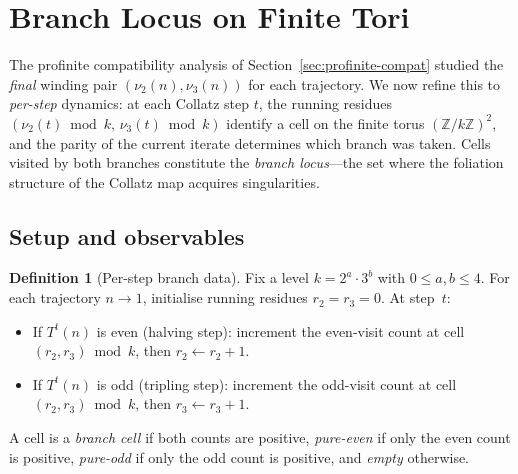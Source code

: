 \documentclass[11pt,a4paper]{article}
\newcommand{\Z}{\mathbb{Z}}
\theoremstyle{plain}
\theoremstyle{definition}
\newtheorem{definition}[theorem]{Definition}
\begin{document}
\section{Branch Locus on Finite Tori}\label{sec:branch-locus}

The profinite compatibility analysis of Section~\ref{sec:profinite-compat}
studied the \emph{final} winding pair $(\nu_2(n), \nu_3(n))$ for each
trajectory.  We now refine this to \emph{per-step} dynamics: at each
Collatz step $t$, the running residues
$(\nu_2(t) \bmod k,\, \nu_3(t) \bmod k)$ identify a cell on the finite
torus $(\Z/k\Z)^2$, and the parity of the current iterate determines
which branch was taken.  Cells visited by both branches constitute the
\emph{branch locus}---the set where the foliation structure of the
Collatz map acquires singularities.


\subsection{Setup and observables}

\begin{definition}[Per-step branch data]\label{def:branch-data}
    Fix a level $k = 2^a \cdot 3^b$ with $0 \leq a,b \leq 4$.  For each
    trajectory $n \to 1$, initialise running residues $r_2 = r_3 = 0$.
    At step~$t$:
    \begin{itemize}
        \item If $T^t(n)$ is even (halving step): increment the even-visit
        count at cell $(r_2, r_3) \bmod k$, then $r_2 \leftarrow r_2 + 1$.
        \item If $T^t(n)$ is odd (tripling step): increment the odd-visit
        count at cell $(r_2, r_3) \bmod k$, then $r_3 \leftarrow r_3 + 1$.
    \end{itemize}
    A cell is a \emph{branch cell} if both counts are positive,
    \emph{pure-even} if only the even count is positive,
    \emph{pure-odd} if only the odd count is positive, and
    \emph{empty} otherwise.
\end{definition}
\end{document}

